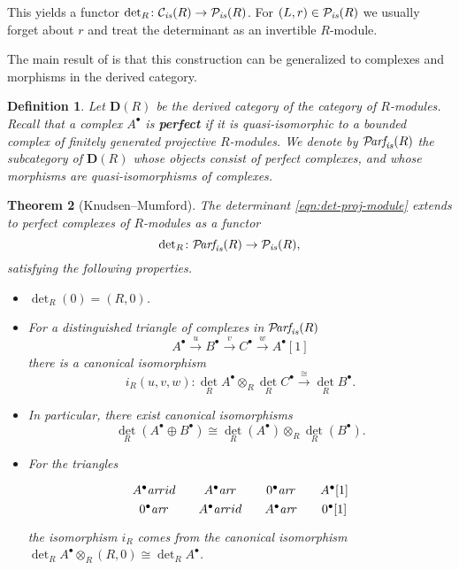 \documentclass[10pt,a4paper,oneside]{article}
\newcommand{\Parf}{\mathcal{P}\!\text{\it arf}}
\renewcommand{\det}{\operatorname{det}}
\newcommand{\ar}{\text{\it ar}}
\newcommand{\is}{\text{\it is}}
\theoremstyle{myplain}
\newtheorem{theorem}{Theorem}[section]
\theoremstyle{mydefinition}
\newtheorem{definition}[theorem]{Definition}
\numberwithin{equation}{section}
\begin{document}
\begin{appendices}
This yields a functor
$\det_R\colon \mathcal{C}_\is (R) \to \mathcal{P}_\is (R)$.
For $(L,r) \in \mathcal{P}_\is (R)$ we usually forget about $r$ and treat the
determinant as an invertible $R$-module.

The main result of \cite[Chapter~I]{Knudsen-Mumford-1976} is that this
construction can be generalized to complexes and morphisms in the derived
category.

\begin{definition}
  Let $\mathbf{D} (R)$ be the derived category of the category of
  $R$-modules. Recall that a complex $A^\bullet$ is \textbf{perfect} if it is
  quasi-isomorphic to a bounded complex of finitely generated projective
  $R$-modules. We denote by $\Parf_\is (R)$ the subcategory of $\mathbf{D} (R)$
  whose objects consist of perfect complexes, and whose morphisms are
  quasi-isomorphisms of complexes.
\end{definition}

\begin{theorem}[Knudsen--Mumford]
  The determinant \eqref{eqn:det-proj-module} extends to perfect complexes of
  $R$-modules as a functor
  $$\det_R\colon \Parf_\is (R) \to \mathcal{P}_\is (R),$$
  satisfying the following properties.

  \begin{itemize}
  \item $\det_R (0) = (R,0)$.

  \item For a distinguished triangle of complexes in $\Parf_\is (R)$
    \[ A^\bullet \xrightarrow{u}
      B^\bullet \xrightarrow{v}
      C^\bullet \xrightarrow{w} A^\bullet [1] \]
    there is a canonical isomorphism
    \[ i_R (u,v,w)\colon \det_R A^\bullet \otimes_R \det_R C^\bullet
      \xrightarrow{\cong} \det_R B^\bullet. \]

  \item In particular, there exist canonical isomorphisms
    \[ \det_R (A^\bullet \oplus B^\bullet) \cong
      \det_R (A^\bullet) \otimes_R \det_R (B^\bullet). \]

  \item For the triangles
    \[ \begin{tikzcd}[column sep=1em]
        A^\bullet \ar{r}{id} & A^\bullet \ar{r} & 0^\bullet \ar{r} & A^\bullet [1] \\[-2em]
        0^\bullet \ar{r} & A^\bullet \ar{r}{id} & A^\bullet \ar{r} & 0^\bullet [1]
      \end{tikzcd} \]
    the isomorphism $i_R$ comes from the canonical isomorphism
    $\det_R A^\bullet \otimes_R (R,0) \cong \det_R A^\bullet$.


\end{itemize}
\end{theorem}
\end{appendices}
\end{document}
